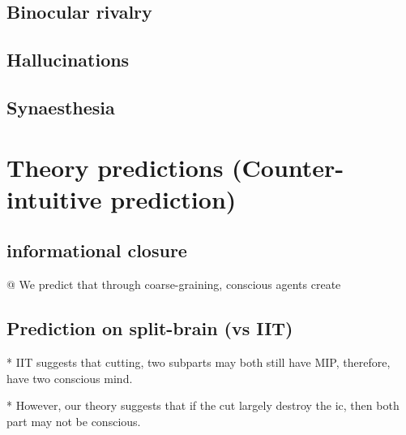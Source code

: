 \documentclass[utf8]{article}
\newenvironment{ants}
			{
			 \begin{easylist}[itemize]		
		 	}
			{
			\end{easylist}
			}
\begin{document}
\subsection{Binocular rivalry}
\subsection{Hallucinations}
\subsection{Synaesthesia}




	\section*{Theory predictions (Counter-intuitive prediction)}	

\subsection{informational closure}
\begin{ants}
	@ We predict that through coarse-graining, conscious agents create 
\end{ants}



\subsection{Prediction on split-brain (vs IIT)}
* IIT suggests that cutting, two subparts may both still have MIP, therefore, have two conscious mind. 

* However, our theory suggests that if the cut largely destroy the \ac{ic}, then both part may not be conscious. 
\end{document}
